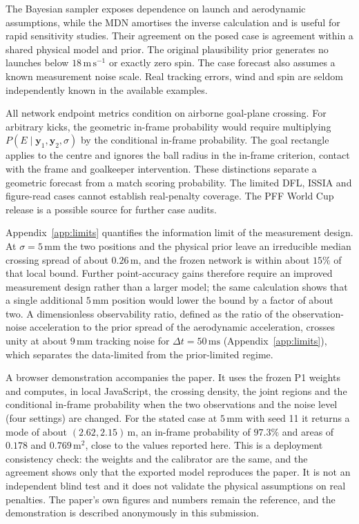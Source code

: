 \documentclass[11pt,a4paper]{article}
\begin{document}
The Bayesian sampler exposes dependence on launch and aerodynamic assumptions, while the MDN amortises the inverse calculation and is useful for rapid sensitivity studies. Their agreement on the posed case is agreement within a shared physical model and prior. The original plausibility prior generates no launches below $18\,\mathrm{m\,s^{-1}}$ or exactly zero spin. The case forecast also assumes a known measurement noise scale. Real tracking errors, wind and spin are seldom independently known in the available examples.

All network endpoint metrics condition on airborne goal-plane crossing. For arbitrary kicks, the geometric in-frame probability would require multiplying $P(E\mid\mathbf{y}_1,\mathbf{y}_2,\sigma)$ by the conditional in-frame probability. The goal rectangle applies to the centre and ignores the ball radius in the in-frame criterion, contact with the frame and goalkeeper intervention. These distinctions separate a geometric forecast from a match scoring probability. The limited DFL, ISSIA and figure-read cases cannot establish real-penalty coverage. The PFF World Cup release \cite{pff2022} is a possible source for further case audits.

Appendix~\ref{app:limits} quantifies the information limit of the measurement design. At $\sigma=5\,\mathrm{mm}$ the two positions and the physical prior leave an irreducible median crossing spread of about $0.26\,\mathrm{m}$, and the frozen network is within about $15\%$ of that local bound. Further point-accuracy gains therefore require an improved measurement design rather than a larger model; the same calculation shows that a single additional $5\,\mathrm{mm}$ position would lower the bound by a factor of about two. A dimensionless observability ratio, defined as the ratio of the observation-noise acceleration to the prior spread of the aerodynamic acceleration, crosses unity at about $9\,\mathrm{mm}$ tracking noise for $\Delta t=50\,\mathrm{ms}$ (Appendix~\ref{app:limits}), which separates the data-limited from the prior-limited regime.

A browser demonstration accompanies the paper. It uses the frozen P1 weights and computes, in local JavaScript, the crossing density, the joint regions and the conditional in-frame probability when the two observations and the noise level (four settings) are changed. For the stated case at $5\,\mathrm{mm}$ with seed 11 it returns a mode of about $(2.62,2.15)\,\mathrm{m}$, an in-frame probability of $97.3\%$ and areas of $0.178$ and $0.769\,\mathrm{m^2}$, close to the values reported here. This is a deployment consistency check: the weights and the calibrator are the same, and the agreement shows only that the exported model reproduces the paper. It is not an independent blind test and it does not validate the physical assumptions on real penalties. The paper's own figures and numbers remain the reference, and the demonstration is described anonymously in this submission.
\end{document}
